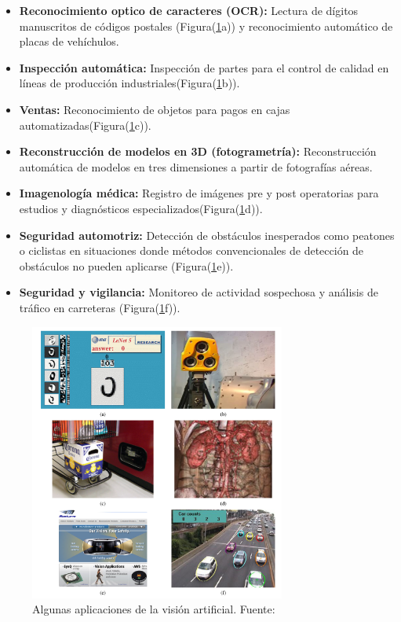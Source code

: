 \begin{itemize}
    \item \textbf{Reconocimiento optico de caracteres (OCR):} Lectura de dígitos manuscritos de códigos postales (Figura(\ref{fig:cvision}a)) y reconocimiento automático de placas de vehíchulos.
    \item \textbf{Inspección automática:} Inspección de partes para el control de calidad en líneas de producción industriales(Figura(\ref{fig:cvision}b)).
    \item \textbf{Ventas:} Reconocimiento de objetos para pagos en cajas automatizadas(Figura(\ref{fig:cvision}c)).
    \item \textbf{Reconstrucción de modelos en 3D (fotogrametría):} Reconstrucción automática de modelos en tres dimensiones a partir de fotografías aéreas.
    \item \textbf{Imagenología médica:}  Registro de imágenes pre y post operatorias para estudios y diagnósticos especializados(Figura(\ref{fig:cvision}d)).
    \item \textbf{Seguridad automotriz:} Detección de obstáculos inesperados como peatones o ciclistas en situaciones donde métodos convencionales de detección de obstáculos no pueden aplicarse (Figura(\ref{fig:cvision}e)).
    \item \textbf{Seguridad y vigilancia:} Monitoreo de actividad sospechosa y análisis de tráfico en carreteras (Figura(\ref{fig:cvision}f)).
\end{itemize}


\begin{figure}[!h] 
    \centering
    \includegraphics[width=0.75\textwidth]{img/cvision}
    \caption{Algunas aplicaciones de la visión artificial. Fuente: \cite{Szeliski2011} }
    \label{fig:cvision}
\end{figure}

